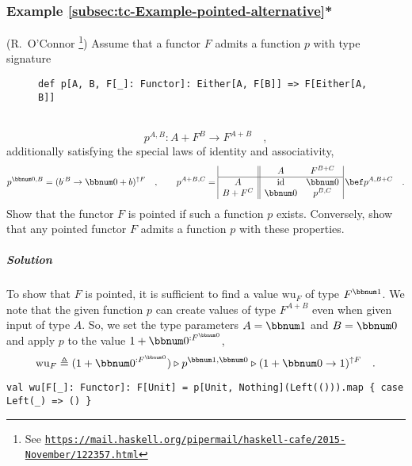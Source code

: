 \subsubsection{Example \label{subsec:tc-Example-pointed-alternative}\ref{subsec:tc-Example-pointed-alternative}{*}}

(R.~O'Connor \footnote{See \texttt{\href{https://mail.haskell.org/pipermail/haskell-cafe/2015-November/122357.html}{https://mail.haskell.org/pipermail/haskell-cafe/2015-November/122357.html}}})
Assume that a functor $F$ admits a function $p$ with type signature

\begin{wrapfigure}{l}{0.63\columnwidth}%
\vspace{-0.75\baselineskip}
\begin{lstlisting}
def p[A, B, F[_]: Functor]: Either[A, F[B]] => F[Either[A, B]]
\end{lstlisting}

\vspace{-0.6\baselineskip}
\end{wrapfigure}%

\noindent ~\vspace{-0.5\baselineskip}
\[
p^{A,B}:A+F^{B}\rightarrow F^{A+B}\quad,
\]
additionally satisfying the special laws of identity and associativity,
\[
p^{\bbnum 0,B}=(b^{:B}\rightarrow\bbnum 0+b)^{\uparrow F}\quad,\quad\quad p^{A+B,C}=\begin{array}{|c||cc|}
 & A & F^{B+C}\\
\hline A & \text{id} & \bbnum 0\\
B+F^{C} & \bbnum 0 & p^{B,C}
\end{array}\,\bef p^{A,B+C}\quad.
\]
Show that the functor $F$ is pointed if such a function $p$ exists.
Conversely, show that any pointed functor $F$ admits a function $p$
with these properties.

\subparagraph{Solution}

To show that $F$ is pointed, it is sufficient to find a value $\text{wu}_{F}$
of type $F^{\bbnum 1}$. We note that the given function $p$ can
create values of type $F^{A+B}$ even when given input of type $A$.
So, we set the type parameters $A=\bbnum 1$ and $B=\bbnum 0$ and
apply $p$ to the value $1+\bbnum 0^{:F^{\bbnum 0}}$,
\[
\text{wu}_{F}\triangleq(1+\bbnum 0^{:F^{\bbnum 0}})\triangleright p^{\bbnum 1,\bbnum 0}\triangleright(1+\bbnum 0\rightarrow1)^{\uparrow F}\quad.
\]
\begin{lstlisting}
val wu[F[_]: Functor]: F[Unit] = p[Unit, Nothing](Left(())).map { case Left(_) => () }
\end{lstlisting}

